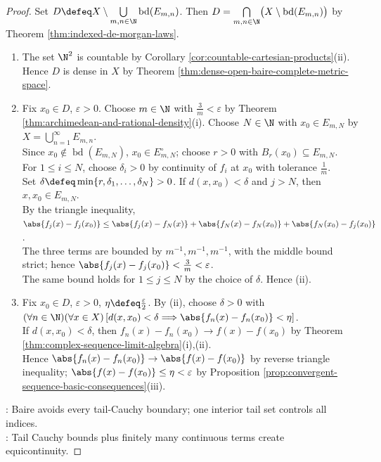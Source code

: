 \begin{theorem}
\begin{proof}
Set $D\defeq X\setminus\bigcup\limits_{m,n\in\N}\operatorname{bd}(E_{m,n})$. Then $D=\bigcap\limits_{m,n\in\N}\bigl(X\setminus\operatorname{bd}(E_{m,n})\bigr)$ by Theorem \ref{thm:indexed-de-morgan-laws}.
\begin{enumerate}[label=(\roman*)]
\setlength{\itemsep}{0pt}
\item[$(i)$] The set $\N^2$ is countable by Corollary \ref{cor:countable-cartesian-products}(ii). Hence $D$ is dense in $X$ by Theorem \ref{thm:dense-open-baire-complete-metric-space}.
\item[$(ii)$] Fix $x_0\in D$, $\varepsilon>0$. Choose $m\in\N$ with $\frac{3}{m}<\varepsilon$ by Theorem \ref{thm:archimedean-and-rational-density}(i). Choose $N\in\N$ with $x_0\in E_{m,N}$ by $X=\bigcup\limits_{n=1}^{\infty}E_{m,n}$.\\
Since $x_0\notin\operatorname{bd}(E_{m,N})$, $x_0\in E_{m,N}^\circ$; choose $r>0$ with $B_r(x_0)\subseteq E_{m,N}$.\\
For $1\leq i\leq N$, choose $\delta_i>0$ by continuity of $f_i$ at $x_0$ with tolerance $\frac{1}{m}$.\\
Set $\delta\defeq\min\{r,\delta_1,\ldots,\delta_N\}>0$. If $d(x,x_0)<\delta$ and $j>N$, then $x,x_0\in E_{m,N}$.\\
By the triangle inequality, $\abs{f_j(x)-f_j(x_0)}\leq\abs{f_j(x)-f_N(x)}+\abs{f_N(x)-f_N(x_0)}+\abs{f_N(x_0)-f_j(x_0)}$.\\
The three terms are bounded by $m^{-1},m^{-1},m^{-1}$, with the middle bound strict; hence $\abs{f_j(x)-f_j(x_0)}<\frac{3}{m}<\varepsilon$.\\
The same bound holds for $1\leq j\leq N$ by the choice of $\delta$. Hence (ii).
\item[$(iii)$] Fix $x_0\in D$, $\varepsilon>0$, $\eta\defeq\frac{\varepsilon}{2}$. By (ii), choose $\delta>0$ with $(\forall n\in\N)(\forall x\in X)\,[d(x,x_0)<\delta\Longrightarrow\abs{f_n(x)-f_n(x_0)}<\eta]$.\\
If $d(x,x_0)<\delta$, then $f_n(x)-f_n(x_0)\to f(x)-f(x_0)$ by Theorem \ref{thm:complex-sequence-limit-algebra}(i),(ii).\\
Hence $\abs{f_n(x)-f_n(x_0)}\to\abs{f(x)-f(x_0)}$ by reverse triangle inequality; $\abs{f(x)-f(x_0)}\leq\eta<\varepsilon$ by Proposition \ref{prop:convergent-sequence-basic-consequences}(iii).
\end{enumerate}
: Baire avoids every tail-Cauchy boundary; one interior tail set controls all indices.\\
: Tail Cauchy bounds plus finitely many continuous terms create equicontinuity.
\end{proof}
\end{theorem}

